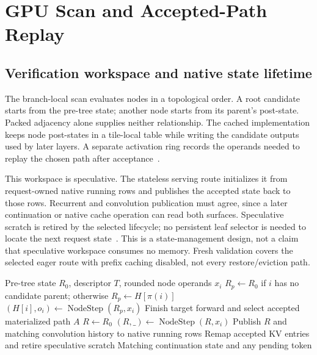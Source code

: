 \documentclass[conference]{IEEEtran}
\begin{document}
\section{GPU Scan and Accepted-Path Replay}
\label{sec:kernel}
\subsection{Verification workspace and native state lifetime}
The branch-local scan evaluates nodes in a topological order. A root candidate starts from the pre-tree state; another node starts from its parent's post-state. Packed adjacency alone supplies neither relationship. The cached implementation keeps node post-states in a tile-local table while writing the candidate outputs used by later layers. A separate activation ring records the operands needed to replay the chosen path after acceptance~\cite{lumo2026archive}.

This workspace is speculative. The stateless serving route initializes it from request-owned native running rows and publishes the accepted state back to those rows. Recurrent and convolution publication must agree, since a later continuation or native cache operation can read both surfaces. Speculative scratch is retired by the selected lifecycle; no persistent leaf selector is needed to locate the next request state~\cite{lumo2026stateless}. This is a state-management design, not a claim that speculative workspace consumes no memory. Fresh validation covers the selected eager route with prefix caching disabled, not every restore/eviction path.

\begin{algorithm}[t]
\caption{Logical scan and selected-path publication; compiled loops may include masked padding.}
\label{alg:scan-replay}
\begin{algorithmic}[1]
\REQUIRE Pre-tree state $R_0$, descriptor $T$, rounded node operands $x_i$
\STATE $R_p\gets R_0$ if $i$ has no candidate parent; otherwise $R_p\gets H[\pi(i)]$
\STATE $(H[i],o_i)\gets\operatorname{NodeStep}(R_p,x_i)$
\ENDFOR
\STATE Finish target forward and select accepted materialized path $A$
\STATE $R\gets R_0$
\STATE $(R,\_)\gets\operatorname{NodeStep}(R,x_i)$
\ENDFOR
\STATE Publish $R$ and matching convolution history to native running rows
\STATE Remap accepted KV entries and retire speculative scratch
\RETURN Matching continuation state and any pending token
\end{algorithmic}
\end{algorithm}
\end{document}
